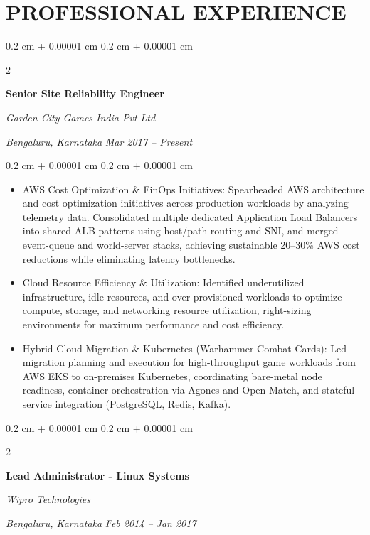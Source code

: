 \documentclass[10pt, letterpaper]{article}
\newenvironment{highlights}{
    \begin{itemize}[
        topsep=0.10 cm,
        parsep=0.10 cm,
        partopsep=0pt,
        itemsep=0pt,
        leftmargin=0.4 cm + 10pt
    ]
}{
    \end{itemize}
} %
\newenvironment{onecolentry}{
    \begin{adjustwidth}{
        0.2 cm + 0.00001 cm
    }{
        0.2 cm + 0.00001 cm
    }
}{
    \end{adjustwidth}
} %
\newenvironment{twocolentry}[2][]{
    \onecolentry
    \def\secondColumn{#2}
    \setcolumnwidth{\fill, 4.5 cm}
    \begin{paracol}{2}
}{
    \switchcolumn \raggedleft \secondColumn
    \end{paracol}
    \endonecolentry
} %
\begin{document}
    \section{PROFESSIONAL EXPERIENCE}
        \begin{twocolentry}{
        \textit{Bengaluru, Karnataka}    
        \textit{Mar 2017 – Present}}
            \textbf{Senior Site Reliability Engineer}
            
            \textit{Garden City Games India Pvt Ltd}
        \end{twocolentry}

        \vspace{0.10 cm}
        \begin{onecolentry}
            \begin{highlights}
                \item AWS Cost Optimization \& FinOps Initiatives: Spearheaded AWS architecture and cost optimization initiatives across production workloads by analyzing telemetry data. Consolidated multiple dedicated Application Load Balancers into shared ALB patterns using host/path routing and SNI, and merged event-queue and world-server stacks, achieving sustainable 20–30\% AWS cost reductions while eliminating latency bottlenecks.
                \item Cloud Resource Efficiency \& Utilization: Identified underutilized infrastructure, idle resources, and over-provisioned workloads to optimize compute, storage, and networking resource utilization, right-sizing environments for maximum performance and cost efficiency.
                \item Hybrid Cloud Migration \& Kubernetes (Warhammer Combat Cards): Led migration planning and execution for high-throughput game workloads from AWS EKS to on-premises Kubernetes, coordinating bare-metal node readiness, container orchestration via Agones and Open Match, and stateful-service integration (PostgreSQL, Redis, Kafka).
            \end{highlights}
        \end{onecolentry}

        \vspace{0.2 cm}
        \begin{twocolentry}{
        \textit{Bengaluru, Karnataka}    
        \textit{Feb 2014 – Jan 2017}}
            \textbf{Lead Administrator - Linux Systems}
            
            \textit{Wipro Technologies}
        \end{twocolentry}
\end{document}
